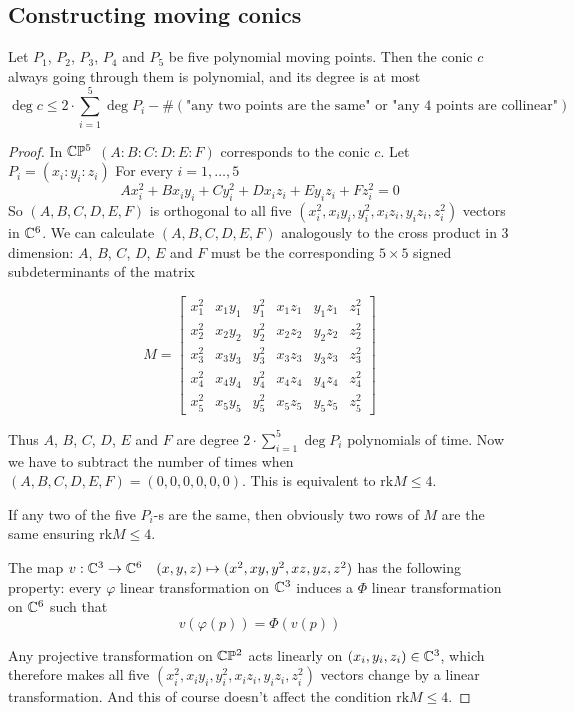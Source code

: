 \documentclass[a4paper]{article}
\begin{document}
\subsection{Constructing moving conics}

\begin{theorem}\label{conicthr5}
    Let $P_1$, $P_2$, $P_3$, $P_4$ and $P_5$ be five polynomial moving points. Then the conic $c$ always going through them is polynomial, and its degree is at most
    $$\deg c\le 2\cdot\sum_{i=1}^5\deg P_i-\#(\text{"any two points are the same" or "any 4 points are collinear"})$$
\end{theorem}
\begin{proof}
    In $\mathbb{C}\mathbb{P}^5$ $(A:B:C:D:E:F)$ corresponds to the conic $c$. Let $P_i=(x_i:y_i:z_i)$
    For every $i=1,\ldots ,5$ $$Ax_i^2+Bx_iy_i+Cy_i^2+Dx_iz_i+Ey_iz_i+Fz_i^2=0$$
    So $(A,B,C,D,E,F)$ is orthogonal to all five $(x_i^2, x_iy_i, y_i^2, x_iz_i, y_iz_i, z_i^2)$ vectors in $\mathbb{C}^6$.
    We can calculate $(A,B,C,D,E,F)$ analogously to the cross product in 3 dimension:
    $A$, $B$, $C$, $D$, $E$ and $F$ must be the corresponding $5\times5$ signed subdeterminants of the matrix

    $$M=
    \begin{bmatrix}
    x_1^2 & x_1 y_1 & y_1^2 & x_1 z_1 & y_1 z_1 & z_1^2 \\[4pt]
    x_2^2 & x_2 y_2 & y_2^2 & x_2 z_2 & y_2 z_2 & z_2^2 \\[4pt]
    x_3^2 & x_3 y_3 & y_3^2 & x_3 z_3 & y_3 z_3 & z_3^2 \\[4pt]
    x_4^2 & x_4 y_4 & y_4^2 & x_4 z_4 & y_4 z_4 & z_4^2 \\[4pt]
    x_5^2 & x_5 y_5 & y_5^2 & x_5 z_5 & y_5 z_5 & z_5^2
    \end{bmatrix}$$

    Thus $A$, $B$, $C$, $D$, $E$ and $F$ are degree $2\cdot\sum_{i=1}^5\deg P_i$ polynomials of time.
    Now we have to subtract the number of times when $(A,B,C,D,E,F)=(0,0,0,0,0,0)$. This is equivalent to $\mathrm{rk}M\le 4$.

    If any two of the five $P_i$-s are the same, then obviously two rows of $M$ are the same ensuring $\mathrm{rk}M\le 4$.

    The map $v:\mathbb{C}^3\to \mathbb{C}^6\quad (x,y,z)\mapsto (x^2,xy,y^2,xz,yz,z^2)$ has the following property:
    every $\varphi$ linear transformation on $\mathbb{C}^3$ induces a $\Phi$ linear transformation on $\mathbb{C}^6$ such that $$v(\varphi(p))=\Phi(v(p))$$

    Any projective transformation on $\mathbb{C}\mathbb{P}^2$ acts linearly on $(x_i,y_i,z_i)\in \mathbb{C}^3$, which therefore makes all five $(x_i^2, x_iy_i, y_i^2, x_iz_i, y_iz_i, z_i^2)$ vectors change by a linear transformation. And this of course doesn't affect the condition
    $\mathrm{rk}M\le 4$.


\end{proof}
\end{document}
